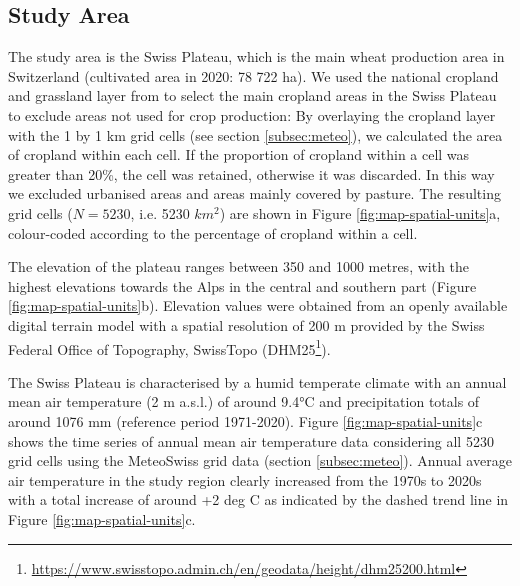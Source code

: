 \subsection{Study Area}
\label{data:study-area}
The study area is the Swiss Plateau, which is the main wheat production area in Switzerland (cultivated area in 2020: 78 722 ha). We used the national cropland and grassland layer from \cite{pazur_national_2022} to select the main cropland areas in the Swiss Plateau to exclude areas not used for crop production: By overlaying the cropland layer with the 1 by 1 km grid cells (see section \ref{subsec:meteo}), we calculated the area of cropland within each cell. If the proportion of cropland within a cell was greater than 20\%, the cell was retained, otherwise it was discarded. In this way we excluded urbanised areas and areas mainly covered by pasture. The resulting grid cells ($N = 5230$, i.e. 5230 $km^2$) are shown in Figure \ref{fig:map-spatial-units}a, colour-coded according to the percentage of cropland within a cell.

The elevation of the plateau ranges between 350 and 1000 metres, with the highest elevations towards the Alps in the central and southern part (Figure \ref{fig:map-spatial-units}b). Elevation values were obtained from an openly available digital terrain model with a spatial resolution of 200 m provided by the Swiss Federal Office of Topography, SwissTopo (DHM25\footnote{\url{https://www.swisstopo.admin.ch/en/geodata/height/dhm25200.html}}).

The Swiss Plateau is characterised by a humid temperate climate with an annual mean air temperature (2 m a.s.l.) of around 9.4°C and precipitation totals of around 1076 mm (reference period 1971-2020). Figure \ref{fig:map-spatial-units}c shows the time series of annual mean air temperature data considering all 5230 grid cells using the MeteoSwiss grid data (section \ref{subsec:meteo}). Annual average air temperature in the study region clearly increased from the 1970s to 2020s with a total increase of around +2 deg C as indicated by the dashed trend line in Figure \ref{fig:map-spatial-units}c.

